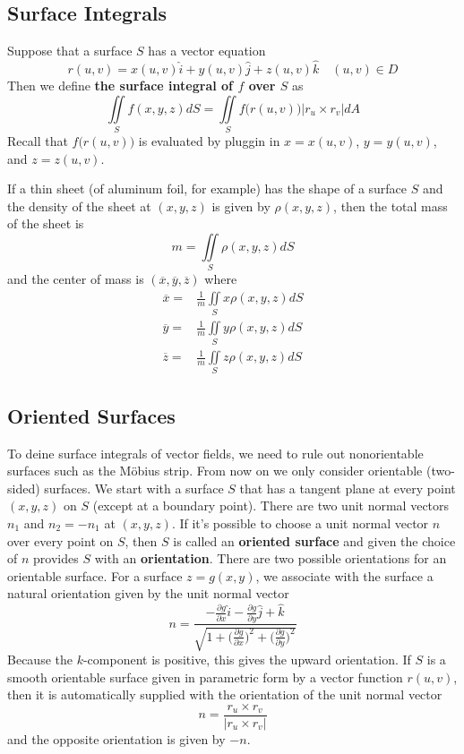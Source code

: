 \subsection{Surface Integrals}

Suppose that a surface $S$ has a vector equation $$r(u,v) = x(u,v)\hat{i} + y(u,v)\hat{j} + z(u,v)\hat{k} \quad (u,v) \in D$$ Then we define \textbf{the surface integral of $f$ over $S$} as $$\iint\limits_S f(x,y,z) dS = \iint\limits_S f\big(r(u,v) \big) | r_u \times r_v | dA $$ Recall that $f\big(r(u,v)\big)$ is evaluated by pluggin in $x = x(u,v)$, $y = y(u,v)$, and $z = z(u,v)$.

If a thin sheet (of aluminum foil, for example) has the shape of a surface $S$ and the density of the sheet at $(x,y,z)$ is given by $\rho (x,y,z)$, then the total mass of the sheet is $$m = \iint\limits_S \rho (x,y,z) dS$$ and the center of mass is $(\overline{x}, \overline{y}, \overline{z})$ where $$\begin{aligned}
    \overline{x} =&\frac{1}{m}\iint\limits_S x \rho (x,y,z) dS\\
    \overline{y} =&\frac{1}{m}\iint\limits_S y \rho (x,y,z) dS\\
    \overline{z} =&\frac{1}{m}\iint\limits_S z \rho (x,y,z) dS
\end{aligned}$$

\subsection{Oriented Surfaces}

To deine surface integrals of vector fields, we need to rule out nonorientable surfaces such as the Möbius strip. From now on we only consider orientable (two-sided) surfaces. We start with a surface $S$ that has a tangent plane at every point $(x,y,z)$ on $S$ (except at a boundary point). There are two unit normal vectors $n_1$ and $n_2 = -n_1$ at $(x,y,z)$. If it's possible to choose a unit normal vector $n$ over every point on $S$, then $S$ is called an \textbf{oriented surface} and given the choice of $n$ provides $S$ with an \textbf{orientation}. There are two possible orientations for an orientable surface. For a surface $z = g(x,y)$, we associate with the surface a natural orientation given by the unit normal vector $$n = \frac{-\frac{\partial g}{\partial x}\hat{i} - \frac{\partial g}{\partial y}\hat{j} + \hat{k}}{\sqrt{1 + \Big( \frac{\partial g}{\partial x} \Big)^2 + \Big( \frac{\partial g}{\partial y} \Big)^2}}$$ Because the $k$-component is positive, this gives the upward orientation. If $S$ is a smooth orientable surface given in parametric form by a vector function $r(u,v)$, then it is automatically supplied with the orientation of the unit normal vector $$n = \frac{r_u \times r_v}{|r_u \times r_v|}$$ and the opposite orientation is given by $-n$.

